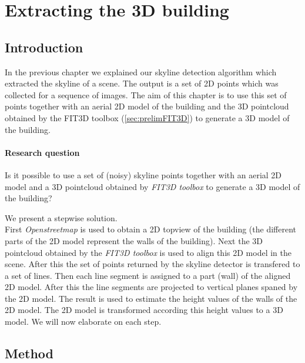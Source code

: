 


\section{Extracting the 3D building}
\label{sec:generate3dModel}
\subsection{Introduction}
In the previous chapter we explained our skyline detection algorithm which
extracted the skyline of a scene. The output is a set of 2D points which was  
collected for a sequence of images.
The aim of this chapter is to use this set of points together with an
 aerial 2D model of the building and the 3D pointcloud obtained by the FIT3D
 toolbox\cite{fit3d} (\ref{sec:prelimFIT3D}) to generate a 3D model of the
 building.


\paragraph{Research question}
Is it possible to use a set of (noisy) skyline points together with an aerial
2D model and a 3D pointcloud obtained by \emph{FIT3D toolbox\cite{fit3d}} to generate a 3D model of the building?


We present a stepwise solution.\\ 
First \emph{Openstreetmap} is used to obtain a 2D topview of the building (the
different parts of the 2D model represent the walls of the building). Next the
3D pointcloud obtained by the \emph{FIT3D toolbox\cite{fit3d}} is used to align this 2D
model in the scene.  After this the set of points returned by the skyline
detector is transfered to a set of lines. Then each line segment is assigned to
a part (wall) of the aligned 2D model.  After this the line segments are
projected to vertical planes spaned by the 2D model.  The result is used to
estimate the height values of the walls of the 2D model. The 2D model is
transformed according this height values to a 3D
model. We will now elaborate on each step.\\


\subsection{Method}
